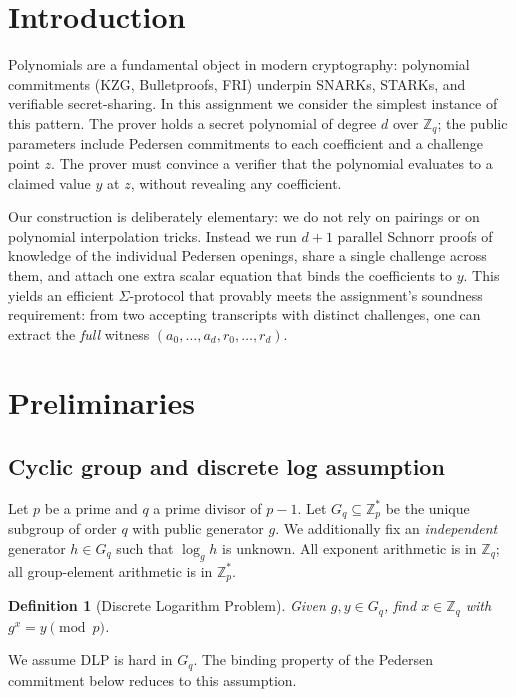 \documentclass[11pt,a4paper]{article}
\newtheorem{definition}{Definition}
\begin{document}
\section{Introduction}

Polynomials are a fundamental object in modern cryptography: polynomial
commitments (KZG, Bulletproofs, FRI) underpin SNARKs, STARKs, and
verifiable secret-sharing. In this assignment we consider the simplest
instance of this pattern. The prover holds a secret polynomial of degree
$d$ over $\mathbb{Z}_q$; the public parameters include Pedersen
commitments to each coefficient and a challenge point $z$. The prover
must convince a verifier that the polynomial evaluates to a claimed
value $y$ at $z$, without revealing any coefficient.

Our construction is deliberately elementary: we do not rely on pairings
or on polynomial interpolation tricks. Instead we run $d+1$ parallel
Schnorr proofs of knowledge of the individual Pedersen openings, share a
single challenge across them, and attach one extra scalar equation that
binds the coefficients to $y$. This yields an efficient $\Sigma$-protocol
that provably meets the assignment's soundness requirement: from two
accepting transcripts with distinct challenges, one can extract the
\emph{full} witness $(a_0,\dots,a_d, r_0,\dots,r_d)$.

\section{Preliminaries}

\subsection{Cyclic group and discrete log assumption}

Let $p$ be a prime and $q$ a prime divisor of $p-1$. Let $G_q \subseteq
\mathbb{Z}_p^{*}$ be the unique subgroup of order $q$ with public
generator $g$. We additionally fix an \emph{independent} generator
$h \in G_q$ such that $\log_g h$ is unknown. All exponent arithmetic is
in $\mathbb{Z}_q$; all group-element arithmetic is in $\mathbb{Z}_p^{*}$.

\begin{definition}[Discrete Logarithm Problem]
Given $g, y \in G_q$, find $x \in \mathbb{Z}_q$ with $g^x = y \pmod p$.
\end{definition}

We assume DLP is hard in $G_q$. The binding property of the Pedersen
commitment below reduces to this assumption.
\end{document}
